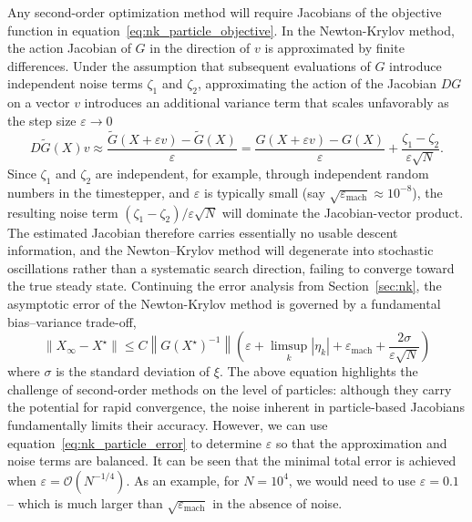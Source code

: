 \documentclass{article}
\newcommand{\norm}[1]{\left\lVert#1\right\rVert}
\begin{document}
Any second-order optimization method will require Jacobians of the objective function in equation~\eqref{eq:nk_particle_objective}. In the Newton-Krylov method, the action Jacobian of $G$ in the direction of $v$ is approximated by finite differences. Under the assumption that subsequent evaluations of $G$ introduce independent noise terms $\zeta_1$ and $\zeta_2$, approximating the action of the Jacobian $D G$ on a vector $v$ introduces an additional variance term that scales unfavorably as the step size $\varepsilon \to 0$
\begin{equation} \label{eq:nk_particles_Gv}
D \tilde{G}(X)v \approx \frac{\tilde{G}(X+\varepsilon v) - \tilde{G}(X)}{\varepsilon} = \frac{G(X+\varepsilon v) - G(X)}{\varepsilon} + \frac{\zeta_1 - \zeta_2}{\varepsilon\sqrt{N}}.
\end{equation}
Since $\zeta_1$ and $\zeta_2$ are independent, for example, through independent random numbers in the timestepper, and $\varepsilon$ is typically small (say $\sqrt{\varepsilon_{\text{mach}}} \approx 10^{-8}$), the resulting noise term $(\zeta_1 - \zeta_2) / \varepsilon\sqrt{N}$ will dominate the Jacobian-vector product. The estimated Jacobian therefore carries essentially no usable descent information, and the Newton–Krylov method will degenerate into stochastic oscillations rather than a systematic search direction, failing to converge toward the true steady state. Continuing the error analysis from Section~\ref{sec:nk}, the asymptotic error of the Newton-Krylov method is governed by a fundamental bias–variance trade-off,
\begin{equation} \label{eq:nk_particle_error}
\norm{X_\infty - X^\star} \leq C\norm{G(X^\star)^{-1}}\left( \varepsilon + \limsup_{k} |\eta_k| + \varepsilon_{\text{mach}} + \frac{2\sigma}{\varepsilon \sqrt{N}} \right)
\end{equation}
where $\sigma$ is the standard deviation of $\xi$. The above equation highlights the challenge of second-order methods on the level of particles: although they carry the potential for rapid convergence, the noise inherent in particle-based Jacobians fundamentally limits their accuracy. However, we can use equation~\eqref{eq:nk_particle_error} to determine $\varepsilon$ so that the approximation and noise terms are balanced. It can be seen that the minimal total error is achieved when $\varepsilon = \mathcal{O}\left(N^{-1/4}\right)$. As an example, for $N=10^4$, we would need to use $\varepsilon = 0.1$ -- which is much larger than $\sqrt{\varepsilon_{\text{mach}}}$ in the absence of noise.
\end{document}

